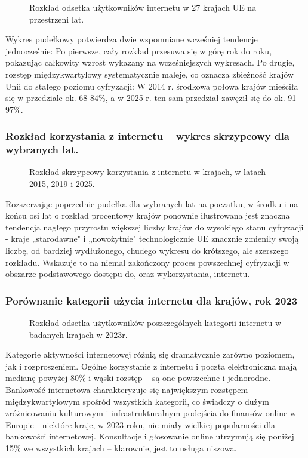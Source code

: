 \documentclass[12pt]{article}
\begin{document}
\begin{figure}[H]
    
    \caption{Rozkład odsetka użytkowników internetu w 27 krajach UE na przestrzeni lat.}
\end{figure}

Wykres pudełkowy potwierdza dwie wspomniane wcześniej tendencje jednocześnie: Po pierwsze, cały rozkład przesuwa się w górę rok do roku, pokazując
całkowity wzrost wykazany na wcześniejszych wykresach. Po drugie, rozstęp międzykwartylowy systematycznie maleje, co oznacza zbieżność
krajów Unii do stałego poziomu cyfryzacji: W 2014 r. środkowa połowa krajów mieściła się w przedziale ok. 68-84\%, a w 2025 r. ten sam przedział 
zawęził się do ok. 91-97\%. 


\subsubsection{Rozkład korzystania z internetu – wykres skrzypcowy dla wybranych lat.}


\begin{figure}[H]
    
    \caption{Rozkład skrzypcowy korzystania z internetu w krajach, w latach 2015, 2019 i 2025.}
\end{figure}

Rozszerzając poprzednie pudełka dla wybranych lat na poczatku, w środku i na końcu osi lat o rozkład procentowy krajów ponownie ilustrowana jest
znaczna tendencja nagłego przyrostu większej liczby krajów do wysokiego stanu cyfryzacji - kraje „starodawne" i „nowożytnie" technologicznie UE 
znacznie zmieniły swoją liczbę, od bardziej wydłużonego, chudego wykresu do krótszego, ale szerszego rozkładu.
Wskazuje to na niemal zakończony proces powszechnej cyfryzacji w obszarze podstawowego dostępu do, oraz wykorzystania, internetu.



\subsubsection{Porównanie kategorii użycia internetu dla krajów, rok 2023}

\begin{figure}[H]
    
    \caption{Rozkład odsetka użytkowników poszczególnych kategorii internetu w badanych krajach w 2023r.}
\end{figure}

Kategorie aktywności internetowej różnią się dramatycznie zarówno poziomem, jak i rozproszeniem. Ogólne korzystanie z internetu i 
poczta elektroniczna mają medianę powyżej 80\% i wąski rozstęp – są one powszechne i jednorodne. 
Bankowość internetowa charakteryzuje się największym rozstępem międzykwartylowym spośród wszystkich kategorii, co świadczy o dużym 
zróżnicowaniu kulturowym i infrastrukturalnym podejścia do finansów online w Europie - niektóre kraje, w 2023 roku, nie miały wielkiej popularności 
dla bankowości internetowej. Konsultacje i głosowanie online utrzymują się poniżej 15\% we wszystkich krajach – klarownie, jest to usługa niszowa.
\end{document}
